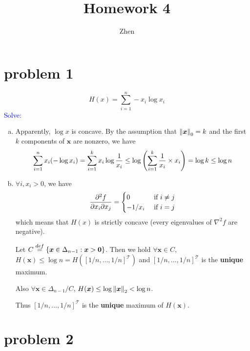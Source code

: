 \documentclass{article}
\def\bx{\boldsymbol{x}}
\def\Esolve{\textcolor{blue}{Solve: }}
\begin{document}
\title{Homework 4}
\author{Zhen}
\maketitle


\section*{problem 1}

$$
H(x)=\sum_{i=1}^n -x_i\log{x_i}
$$
\Esolve
\begin{enumerate}[(a)]
	\item 
		Apparently, $\log{x}$ is concave. By the assumption that $\norm{\bx}_0=k$ and the first $k$ components of $\bx$ are nonzero, we have
		$$
		\sum_{i=1}^nx_i(-\log{x_i})
		=
		\sum_{i=1}^kx_i\log{\frac{1}{x_i}}
		\le
		\log\qty({\sum_{i=1}^k\frac{1}{x_i}\times x_i})
		=
		\log{k}
		\le
		\log{n}
		$$

	\item
		$\forall i,x_i>0$, we have
		$$
		\pdv{f}{x_i}{x_j}=
		\begin{cases}
			0 &\mbox{ if }i\neq j \\
			-1/{x_i} &\mbox{ if } i = j
		\end{cases}
		$$
		which means that $H(x)$ is strictly concave (every eigenvalues of $\nabla^2 f$ are negative).

		Let $C \stackrel{def}{=} \qty{\bx\in\Delta_{n-1}:\bx>\boldsymbol{0}}$. Then we hold $\forall \bx\in C$, $H(\bx)\le\log n=H([1/n,\dots,1/n]^\mathcal{T})$ and $[1/n,\dots,1/n]^\mathcal{T}$ is the \textbf{unique} maximum.

		Also $\forall \bx\in \Delta_{n-1}/C$, $H(\bx)\le\log\norm{\bx}_2<\log n$.

		Thus $[1/n,\dots,1/n]^\mathcal{T}$ is the \textbf{unique} maximum of $H(\bx)$.
\end{enumerate}

\section*{problem 2}
\end{document}
